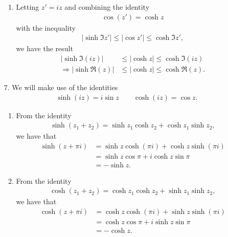 \documentclass[a4paper,12pt]{article}
\begin{document}
\begin{enumerate}
\begin{enumerate}
            \item
                Letting $z' = iz$ and combining the identity
                \begin{align*}
                    \cos(z') = \cosh z
                \end{align*}
                with the inequality
                \begin{align*}
                    |\sinh \Im z'| \leq |\cos z'| \leq \cosh \Im z',
                \end{align*}
                we have the result
                \begin{align*}
                    |\sinh \Im(iz)| &\leq |\cosh z| \leq \cosh \Im(iz) \\
                    \Rightarrow |\sinh \Re(z)| &\leq |\cosh z| \leq \cosh \Re(z).
                \end{align*}
        \end{enumerate}

    \item[7.]
        We will make use of the identities
        \begin{gather*}
            \sinh(iz) = i\sin z \qquad \cosh(iz) = \cos z.
        \end{gather*}
        \begin{enumerate}
            \item
                From the identity
                \begin{gather*}
                    \sinh(z_1 + z_2) = \sinh z_1 \cosh z_2 + \cosh z_1 \sinh z_2,
                \end{gather*}
                we have that
                \begin{align*}
                    \sinh(z + \pi i) &= \sinh z \cosh (\pi i) + \cosh z \sinh (\pi i) \\
                    &= \sinh z \cos \pi + i \cosh z \sin \pi \\
                    &= -\sinh z.
                \end{align*}

            \item
                From the identity
                \begin{gather*}
                    \cosh(z_1 + z_2) = \cosh z_1 \cosh z_2 + \sinh z_1 \sinh z_2,
                \end{gather*}
                we have that
                \begin{align*}
                    \cosh(z + \pi i) &= \cosh z \cosh (\pi i) + \sinh z \sinh (\pi i) \\
                    &= \cosh z \cos \pi + i \sinh z \sin \pi \\
                    &= -\cosh z.
                \end{align*}


\end{enumerate}
\end{enumerate}
\end{document}
